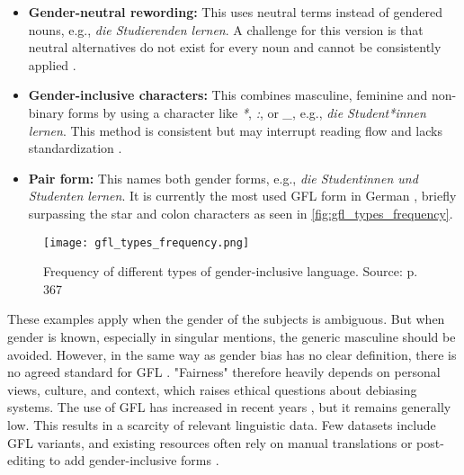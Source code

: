    \begin{itemize}
        \item \textbf{Gender-neutral rewording:}  
        This uses neutral terms instead of gendered nouns, e.g., \textit{die Studierenden lernen}. A challenge for this version is that neutral alternatives do not exist for every noun and cannot be consistently applied \parencite{lardelliBuildingBridgesDataset2024}.

        \item \textbf{Gender-inclusive characters:}  
        This combines masculine, feminine and non-binary forms by using a character like \textit{*}, \textit{:}, or \textit{\_}, e.g., \textit{die Student*innen lernen}. This method is consistent but may interrupt reading flow and lacks standardization \parencite{lardelliBuildingBridgesDataset2024}.

        \item \textbf{Pair form:}  
        This names both gender forms, e.g., \textit{die Studentinnen und Studenten lernen}. It is currently the most used GFL form in German \parencite{waldendorfWordsChangeIncrease2024}, briefly surpassing the star and colon characters as seen in \autoref{fig:gfl_types_frequency}.
    \end{itemize}

    \vspace{0.8em}
    \begin{figure}[htb]
        \centering
            \texttt{[image: gfl\_types\_frequency.png]}
        \caption[Frequency of different types of gender-inclusive language]{Frequency of different types of gender-inclusive language. Source: \textcite{waldendorfWordsChangeIncrease2024} p. 367}
        \label{fig:gfl_types_frequency}
    \end{figure}

    These examples apply when the gender of the subjects is ambiguous. But when gender is known, especially in singular mentions, the generic masculine should be avoided. However, in the same way as gender bias has no clear definition, there is no agreed standard for GFL \parencite{lardelliBuildingBridgesDataset2024, savoldiDecadeGenderBias2025}. "Fairness" therefore heavily depends on personal views, culture, and context, which raises ethical questions about debiasing systems. 
    The use of GFL has increased in recent years \parencite{waldendorfWordsChangeIncrease2024}, but it remains generally low. This results in a scarcity of relevant linguistic data. Few datasets include GFL variants, and existing resources often rely on manual translations or post-editing to add gender-inclusive forms \parencite{lardelliBuildingBridgesDataset2024}. 

